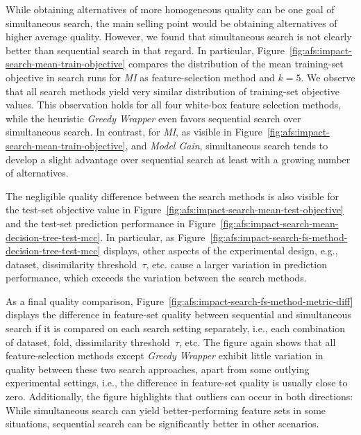 \documentclass{article}
\theoremstyle{definition}
\begin{document}
While obtaining alternatives of more homogeneous quality can be one goal of simultaneous search, the main selling point would be obtaining alternatives of higher average quality.
However, we found that simultaneous search is not clearly better than sequential search in that regard.
In particular, Figure~\ref{fig:afs:impact-search-mean-train-objective} compares the distribution of the mean training-set objective in search runs for \emph{MI} as feature-selection method and $k=5$.
We observe that all search methods yield very similar distribution of training-set objective values.
This observation holds for all four white-box feature selection methods, while the heuristic \emph{Greedy Wrapper} even favors sequential search over simultaneous search.
In contrast, for \emph{MI}, as visible in Figure~\ref{fig:afs:impact-search-mean-train-objective}, and \emph{Model Gain}, simultaneous search tends to develop a slight advantage over sequential search at least with a growing number of alternatives.

The negligible quality difference between the search methods is also visible for the test-set objective value in Figure~\ref{fig:afs:impact-search-mean-test-objective} and the test-set prediction performance in Figure~\ref{fig:afs:impact-search-mean-decision-tree-test-mcc}.
In particular, as Figure~\ref{fig:afs:impact-search-fs-method-decision-tree-test-mcc} displays, other aspects of the experimental design, e.g., dataset, dissimilarity threshold~$\tau$, etc. cause a larger variation in prediction performance, which exceeds the variation between the search methods.

As a final quality comparison, Figure~\ref{fig:afs:impact-search-fs-method-metric-diff} displays the difference in feature-set quality between sequential and simultaneous search if it is compared on each search setting separately, i.e., each combination of dataset, fold, dissimilarity threshold~$\tau$, etc.
The figure again shows that all feature-selection methods except \emph{Greedy Wrapper} exhibit little variation in quality between these two search approaches, apart from some outlying experimental settings, i.e., the difference in feature-set quality is usually close to zero.
Additionally, the figure highlights that outliers can occur in both directions:
While simultaneous search can yield better-performing feature sets in some situations, sequential search can be significantly better in other scenarios.
\end{document}

